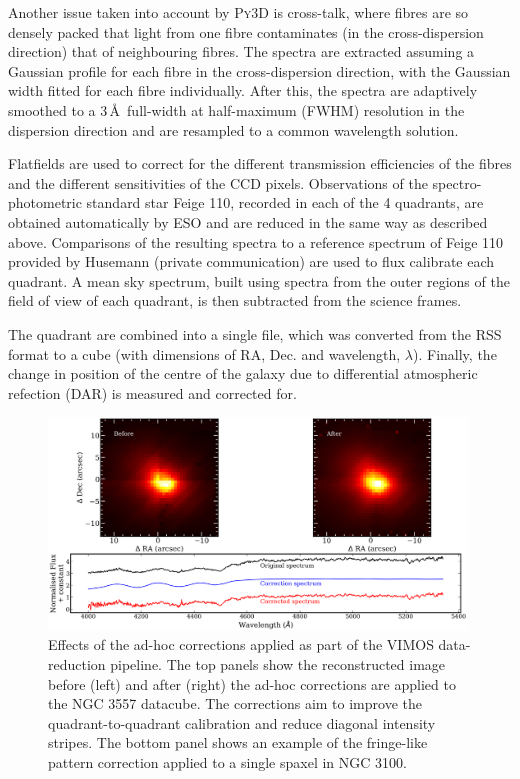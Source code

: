 		Another issue taken into account by \textsc{Py3D} is cross-talk, where fibres are so densely packed that light from one fibre contaminates (in the cross-dispersion direction) that of neighbouring fibres. The spectra are extracted assuming a Gaussian profile for each fibre in the cross-dispersion direction, with the Gaussian width fitted for each fibre individually. After this, the spectra are adaptively smoothed to a 3\,\AA\ full-width at half-maximum (FWHM) resolution in the dispersion direction and are resampled to a common wavelength solution.

		Flatfields are used to correct for the different transmission efficiencies of the fibres and the different sensitivities of the CCD pixels. Observations of the spectro-photometric standard star Feige 110, recorded in each of the 4 quadrants, are obtained automatically by ESO and are reduced in the same way as described above. Comparisons of the resulting spectra to a reference spectrum of Feige 110 provided by Husemann (private communication) are used to flux calibrate each quadrant. A mean sky spectrum, built using spectra from the outer regions of the field of view of each quadrant, is then subtracted from the science frames. 

		The quadrant are combined into a single file, which was converted from the RSS format to a cube (with dimensions of RA, Dec. and wavelength, $\lambda$). Finally, the change in position of the centre of the galaxy due to differential atmospheric refection (DAR) is measured and corrected for. 

		\begin{figure}
			\centering
			\includegraphics[width=0.99\textwidth]{chapter2/corr_image.png}
			\caption[Ad-hoc correction to VIMOS datacubes]{Effects of the ad-hoc corrections applied as part of the VIMOS data-reduction pipeline. The top panels show the reconstructed image before (left) and after (right) the ad-hoc corrections are applied to the NGC 3557 datacube. The corrections aim to improve the quadrant-to-quadrant calibration and reduce diagonal intensity stripes. The bottom panel shows an example of the fringe-like pattern correction applied to a single spaxel in NGC 3100.}
			\label{fig:Correction}
		\end{figure}

